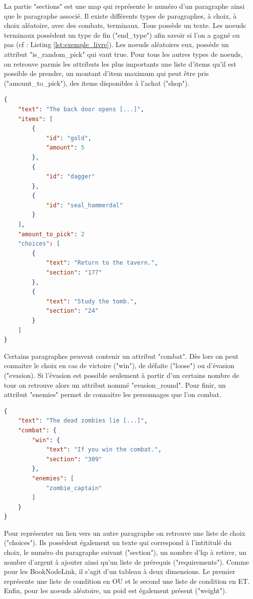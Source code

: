 			La partie "sections" est une map qui représente le numéro d'un paragraphe ainsi que le paragraphe associé. Il existe différents types de paragraphes, à choix, à choix aléatoire, avec des combats, terminaux. Tous possède un texte. Les noeuds terminaux possèdent un type de fin ("end\_type") afin savoir si l'on a gagné ou pas (cf : Listing \ref{lst:exemple_livre}). Les noeuds aléatoires eux, possède un attribut "is\_random\_pick" qui vaut true. Pour tous les autres types de noeuds, on retrouve parmis les attributs les plus importants une liste d'items qu'il est possible de prendre, un montant d'item maximum qui peut être pris ("amount\_to\_pick"), des items disponibles à l'achat ("shop").

\begin{lstlisting}[language=json, caption=Exemple de paragraphe]
{
	"text": "The back door opens [...]",
	"items": [
		{
			"id": "gold",
			"amount": 5
		},
		{
			"id": "dagger"
		},
		{
			"id": "seal_hammerdal"
		}
	],
	"amount_to_pick": 2
	"choices": [
		{
			"text": "Return to the tavern.",
			"section": "177"
		},
		{
			"text": "Study the tomb.",
			"section": "24"
		}
	]
}
\end{lstlisting}

			Certains paragraphes peuvent contenir un attribut "combat". Dès lors on peut connaitre le choix en cas de victoire ("win"), de défaite ("loose") ou d'évasion ("evasion). Si l'évasion est possible seulement à partir d'un certains nombre de tour on retrouve alors un attribut nommé "evasion\_round". Pour finir, un attribut "enemies" permet de connaitre les personnages que l'on combat.

\begin{lstlisting}[language=json, caption=Exemple de paragraphe avec des combats]
{
	"text": "The dead zombies lie [...]",
	"combat": {
		"win": {
			"text": "If you win the combat.",
			"section": "309"
		},
		"enemies": [
			"zombie_captain"
		]
	}
}
\end{lstlisting}

			Pour représenter un lien vers un autre paragraphe on retrouve une liste de choix ("choices"). Ils possèdent également un texte qui correspond à l'intititulé du choix, le numéro du paragraphe suivant ("section"), un nombre d'hp à retirer, un nombre d'argent à ajouter ainsi qu'un liste de prérequis ("requirements"). Comme pour les BookNodeLink, il s'agit d'un tableau à deux dimensions. Le premier représente une liste de condition en OU et le second une liste de condition en ET. Enfin, pour les noeuds aléatoire, un poid est également présent ("weight").

